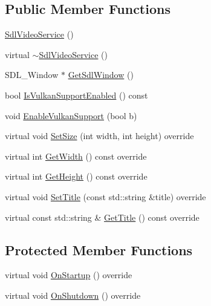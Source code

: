 \subsection*{Public Member Functions}
\begin{DoxyCompactItemize}
\item 
\hyperlink{classastu_1_1SdlVideoService_a21f04798e41b0c5c083acc1eefcbb5c1}{Sdl\+Video\+Service} ()
\item 
virtual \hyperlink{classastu_1_1SdlVideoService_a5ab48fd8569c517151099d71a86cc0b5}{$\sim$\+Sdl\+Video\+Service} ()
\item 
S\+D\+L\+\_\+\+Window $\ast$ \hyperlink{classastu_1_1SdlVideoService_af0282450cc95c0cbc2a6add84603dd7a}{Get\+Sdl\+Window} ()
\item 
bool \hyperlink{classastu_1_1SdlVideoService_aa40bb996597ad6c1005ce9dfd632cf28}{Is\+Vulkan\+Support\+Enabled} () const
\item 
void \hyperlink{classastu_1_1SdlVideoService_a33679f9d46b5aa38c0b75b3b7f16705d}{Enable\+Vulkan\+Support} (bool b)
\item 
virtual void \hyperlink{classastu_1_1SdlVideoService_a1c8d729ef42024bc0cc5065ecc6631c8}{Set\+Size} (int width, int height) override
\item 
virtual int \hyperlink{classastu_1_1SdlVideoService_a45c3181611e718bcfe44862baed6d520}{Get\+Width} () const override
\item 
virtual int \hyperlink{classastu_1_1SdlVideoService_a76d0f56254c9545d4d9762349133d4af}{Get\+Height} () const override
\item 
virtual void \hyperlink{classastu_1_1SdlVideoService_aad3c873db481dd622d6ddcea70b279af}{Set\+Title} (const std\+::string \&title) override
\item 
virtual const std\+::string \& \hyperlink{classastu_1_1SdlVideoService_ad6ee7f7a409960e91ddd77bbcea6432f}{Get\+Title} () const override
\end{DoxyCompactItemize}
\subsection*{Protected Member Functions}
\begin{DoxyCompactItemize}
\item 
virtual void \hyperlink{classastu_1_1SdlVideoService_add229ac2af59a4aea090e4de4c67e530}{On\+Startup} () override
\item 
virtual void \hyperlink{classastu_1_1SdlVideoService_a6d6085e9ff213c5d41546d604ff53e92}{On\+Shutdown} () override
\end{DoxyCompactItemize}
